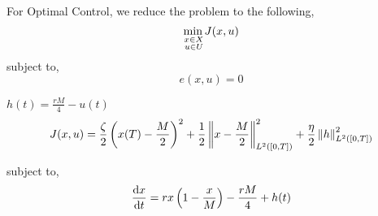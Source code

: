 

For Optimal Control, we reduce the problem to the following,
\begin{equation}
{\displaystyle {\underset {\substack{x\in X \\ u \in U}}{\min\, }}J(x,u)}
\end{equation}
subject to,
\begin{equation}
	e(x,u)=0
\end{equation}

$h(t)=\frac{rM}{4}-u(t)$
\begin{equation}
	J(x,u)=\frac{\zeta}{2} \left(x(T)-\frac{M}{2}\right)^2+\frac{1}{2}\left\lVert x-\frac{M}{2} \right\rVert^2_{L^2([0,T])}+\frac{\eta}{2}\left\lVert h \right\rVert^2_{L^2([0,T])}
\end{equation}

subject to,
\begin{equation}
	\frac{\mathrm{d} x}{{\mathrm{d} t}}=rx\left(1-\frac{x}{M}\right)-\frac{rM}{4}+h(t)
\end{equation}